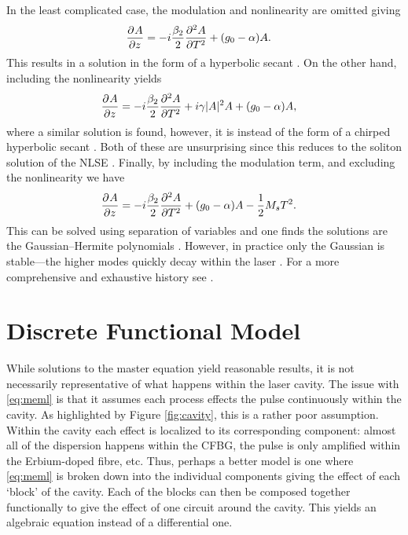 In the least complicated case, the modulation and nonlinearity are omitted giving
\begin{align*}
\pdiff{A}{z} &= - i \frac{\beta_2}{2}\pdiff[2]{A}{T} + \left( g_0 - \alpha \right) A.
\end{align*}
This results in a solution in the form of a hyperbolic secant \cite{haus1975, haus1986, haus1992}. On the other hand, including the nonlinearity yields
\begin{align*}
\pdiff{A}{z} &= - i \frac{\beta_2}{2}\pdiff[2]{A}{T} + i \gamma |A|^2 A + \left( g_0 - \alpha \right) A,
\end{align*}
where a similar solution is found, however, it is instead of the form of a chirped hyperbolic secant \cite{haus1991, usechak}. Both of these are unsurprising since this reduces to the soliton solution of the NLSE \cite{ferreira}. Finally, by including the modulation term, and excluding the nonlinearity we have
\begin{align*}
\pdiff{A}{z} &= - i \frac{\beta_2}{2}\pdiff[2]{A}{T} + \left( g_0 - \alpha \right) A - \frac{1}{2}M_s T^2.
\end{align*}
This can be solved using separation of variables and one finds the solutions are the Gaussian--Hermite polynomials \cite{burgoyne2014, hausbook, haus1975, haus1996, haus2000, kartner, tamura, usechak}. However, in practice only the Gaussian is stable---the higher modes quickly decay within the laser \cite{hausbook, haus1975, haus1996, haus2000}. For a more comprehensive and exhaustive history see \cite{haus2000}. \\

\section{Discrete Functional Model}
While solutions to the master equation yield reasonable results, it is not necessarily representative of what happens within the laser cavity. The issue with \eqref{eq:meml} is that it assumes each process effects the pulse continuously within the cavity. As highlighted by Figure \ref{fig:cavity}, this is a rather poor assumption. Within the cavity each effect is localized to its corresponding component: almost all of the dispersion happens within the CFBG, the pulse is only amplified within the Erbium-doped fibre, etc. Thus, perhaps a better model is one where \eqref{eq:meml} is broken down into the individual components giving the effect of each `block' of the cavity. Each of the blocks can then be composed together functionally to give the effect of one circuit around the cavity. This yields an algebraic equation instead of a differential one. \\

